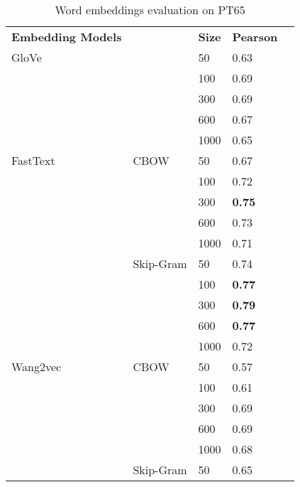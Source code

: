 \begin{table}[]
\caption{Word embeddings evaluation on PT65}
\label{tab:estacoes}
\centering%
\begin{minipage}{.5\textwidth}
\begin{tabular}{@{}lllll@{}}
\cmidrule(r){1-4}
\textbf{Embedding Models} &      & \textbf{Size} & \textbf{Pearson} \\ \cmidrule(r){1-4}
GloVe            &               & 50   & 0.63             \\
                 &               & 100  & 0.69             \\
                 &               & 300  & 0.69             \\
                 &               & 600  & 0.67             \\
                 &               & 1000 & 0.65             \\ \cmidrule(r){1-4}
FastText         & CBOW          & 50   & 0.67             \\
                 &               & 100  & 0.72             \\
                 &               & 300  & \textbf{0.75}    \\
                 &               & 600  & 0.73             \\
                 &               & 1000 & 0.71             \\ \cmidrule(lr){2-4}
                 & Skip-Gram     & 50   & 0.74             \\
                 &               & 100  & \textbf{0.77}    \\
                 &               & 300  & \textbf{0.79}    \\
                 &               & 600  & \textbf{0.77}    \\
                 &               & 1000 & 0.72             \\ \cmidrule(r){1-4}
Wang2vec         & CBOW          & 50   & 0.57             \\
                 &               & 100  & 0.61             \\
                 &               & 300  & 0.69             \\
                 &               & 600  & 0.69             \\
                 &               & 1000 & 0.68             \\ \cmidrule(lr){2-4}
                 & Skip-Gram     & 50   & 0.65             \\

\end{tabular}
\end{minipage}
\end{table}
